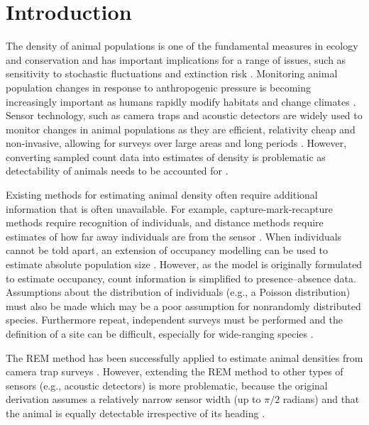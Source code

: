 \section{Introduction}


The density of animal populations is one of the fundamental measures in ecology and conservation and has important implications for a range of issues, such as sensitivity to stochastic fluctuations \cite{wright1983stochastic} and extinction risk \cite{purvis2000predicting}.
Monitoring animal population changes in response to anthropogenic pressure is becoming increasingly important as humans rapidly modify habitats and change climates \cite{everatt2014trophic}.
Sensor technology, such as camera traps \cite{karanth1995estimating, rowcliffe2008surveys} and acoustic detectors \cite{acevedo2006using, walters2012continental} are widely used to monitor changes in animal populations as they are efficient, relativity cheap and non-invasive, allowing for surveys over large areas and long periods \cite{rowcliffe2008surveys, kessel2014review, walters2013challenges}.
However, converting sampled count data into estimates of density is problematic as detectability of animals needs to be accounted for \cite{anderson2001need}.

Existing methods for estimating animal density often require additional information that is often unavailable.
For example, capture-mark-recapture methods \cite{karanth1995estimating, borchers2014continuous} require recognition of individuals, and distance methods \cite{harris2013applying} require estimates of how far away individuals are from the sensor \cite{barlow2005estimates, marques2011estimating}.
When individuals cannot be told apart, an extension of occupancy modelling can be used to estimate absolute population size \cite{royle2003estimating}.
However, as the model is originally formulated to estimate occupancy,  count information is simplified to presence--absence data.
Assumptions about the distribution of individuals (e.g., a Poisson distribution) must also be made \cite{royle2003estimating} which may be a poor assumption for nonrandomly distributed species.
Furthermore repeat, independent surveys must be performed and the definition of a site can be difficult, especially for wide-ranging species \cite{mackenzie2005designing}.

The REM method has been successfully applied to estimate animal densities from camera trap surveys \cite{zero2013monitoring}.
However, extending the REM method to other types of sensors (e.g., acoustic detectors) is more problematic, because the original derivation assumes a relatively narrow sensor width (up to $\pi/2$ radians) and that the animal is equally detectable irrespective of its heading \cite{rowcliffe2008estimating}. 

